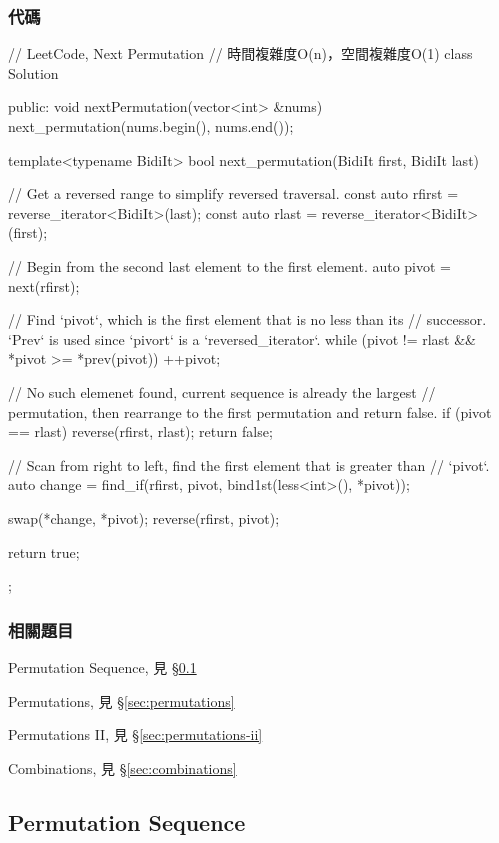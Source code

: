 \subsubsection{代碼}
\begin{Code}
// LeetCode, Next Permutation
// 時間複雜度O(n)，空間複雜度O(1)
class Solution {
public:
    void nextPermutation(vector<int> &nums) {
        next_permutation(nums.begin(), nums.end());
    }

    template<typename BidiIt>
    bool next_permutation(BidiIt first, BidiIt last) {
        // Get a reversed range to simplify reversed traversal.
        const auto rfirst = reverse_iterator<BidiIt>(last);
        const auto rlast = reverse_iterator<BidiIt>(first);

        // Begin from the second last element to the first element.
        auto pivot = next(rfirst);

        // Find `pivot`, which is the first element that is no less than its
        // successor.  `Prev` is used since `pivort` is a `reversed_iterator`.
        while (pivot != rlast && *pivot >= *prev(pivot))
            ++pivot;

        // No such elemenet found, current sequence is already the largest
        // permutation, then rearrange to the first permutation and return false.
        if (pivot == rlast) {
            reverse(rfirst, rlast);
            return false;
        }

        // Scan from right to left, find the first element that is greater than
        // `pivot`.
        auto change = find_if(rfirst, pivot, bind1st(less<int>(), *pivot));

        swap(*change, *pivot);
        reverse(rfirst, pivot);

        return true;
    }
};
\end{Code}


\subsubsection{相關題目}
\begindot
\item Permutation Sequence, 見 \S \ref{sec:permutation-sequence}
\item Permutations, 見 \S \ref{sec:permutations}
\item Permutations II, 見 \S \ref{sec:permutations-ii}
\item Combinations, 見 \S \ref{sec:combinations}
\myenddot


\subsection{Permutation Sequence} %
\label{sec:permutation-sequence}


